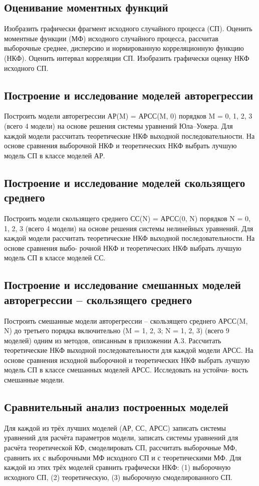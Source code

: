 \documentclass[12pt, fleqn]{article}
\begin{document}
{
							
	\subsection{Оценивание моментных функций}{
		Изобразить графически фрагмент исходного случайного процесса (СП). Оценить моментные функции (МФ) исходного случайного процесса, рассчитав выборочные среднее, дисперсию и нормированную корреляционную функцию (НКФ). Оценить интервал корреляции СП. Изобразить графически оценку НКФ исходного СП.
	}
	\subsection{Построение и исследование моделей авторегрессии}
	{
		Построить модели авторегрессии АР(M) = АРСС(M, 0) порядков M = 0, 1, 2, 3 (всего 4
		модели) на основе решения системы уравнений Юла–Уокера. Для каждой модели рассчитать
		теоретические НКФ выходной последовательности. На основе сравнения выборочной НКФ и
		теоретических НКФ выбрать лучшую модель СП в классе моделей АР.
	}
							
	\subsection{Построение и исследование моделей скользящего среднего}
	{
		Построить модели скользящего среднего СС(N) = АРСС(0, N) порядков N = 0, 1, 2, 3
		(всего 4 модели) на основе решения системы нелинейных уравнений. Для каждой модели
		рассчитать теоретические НКФ выходной последовательности. На основе сравнения выбо-
		рочной НКФ и теоретических НКФ выбрать лучшую модель СП в классе моделей СС.
	}
							
	\subsection{Построение и исследование смешанных моделей авторегрессии – скользящего среднего}
	{
		Построить смешанные модели авторегрессии – скользящего среднего АРСС(M, N) до
		третьего порядка включительно (M = 1, 2, 3; N = 1, 2, 3) (всего 9 моделей) одним из методов,
		описанным в приложении А.3. Рассчитать теоретические НКФ выходной последовательности
		для каждой модели АРСС. На основе сравнения исходной выборочной и теоретических НКФ
		выбрать лучшую модель СП в классе смешанных моделей АРСС. Исследовать на устойчи-
		вость смешанные модели.
	}
							
	\subsection{Сравнительный анализ построенных моделей}
	{
		Для каждой из трёх лучших моделей (АР, СС, АРСС) записать системы уравнений для
		расчёта параметров модели, записать системы уравнений для расчёта теоретической КФ,
		смоделировать СП, рассчитать выборочные МФ, сравнить их с выборочными МФ исходного
		СП и с теоретическими МФ. Для каждой из этих трёх моделей сравнить графически НКФ:
		(1) выборочную исходного СП, (2) теоретическую, (3) выборочную смоделированного СП.
	}
							
}
\end{document}
